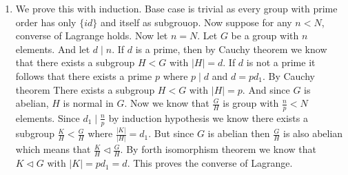 \begin{enumerate}[label=]
    \item
        We prove this with induction. Base case is trivial as every group with prime order has only $\{id\}$ and itself as subgrouop. \newline
        Now suppose for any $n < N$, converse of Lagrange holds. Now let $n = N$. \newline
        Let $G$ be a group with $n$ elements. And let $d \mid n$. If $d$ is a prime, then by Cauchy theorem we know that there exists a subgroup $H < G$ with $|H| = d$. If $d$ is not a prime it follows that there exists a prime $p$ where $p \mid d$ and $d = pd_1$. By Cauchy theorem There exists a subgroup $H < G$ with $|H| = p$. And since $G$ is abelian, $H$ is normal in $G$. Now we know that $\frac{G }{H}$ is group with $\frac{n }{p } < N$ elements. Since $d_1 \mid \frac{n }{p }$ by induction hypothesis we know there exists a subgroup $\frac{K }{H } < \frac{G }{H }$ where $\frac{|K| }{|H| } = d_1$. But since $G$ is abelian then $\frac{G }{H }$ is also abelian which means that $\frac{K }{H } \triangleleft  \frac{G }{H }$. By forth isomorphism theorem we know that $K \triangleleft G$ with $|K| = p d_1 = d$. This proves the converse of Lagrange.
\end{enumerate}